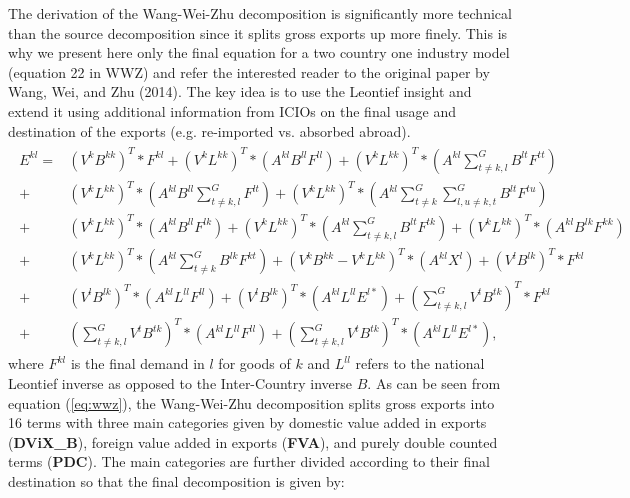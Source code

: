 \documentclass[a4paper]{article}\usepackage[]{graphicx}\usepackage[]{color}
\begin{document}
The derivation of the Wang-Wei-Zhu decomposition is significantly more technical than the source decomposition since it splits gross exports up more finely.
This is why we present here only the final equation for a two country one industry model (equation 22 in WWZ) and refer the interested reader to the original paper by Wang, Wei, and Zhu (2014).
The key idea is to use the Leontief insight and extend it using additional information from ICIOs on the final usage and destination of the exports (e.g. re-imported vs. absorbed abroad).
\begin{align}
\label{eq:wwz}
\begin{split}
E^{kl}
= &\left(V^k B^{kk} \right)^T * F^{kl} 
+ \left(V^k L^{kk} \right)^T * \left(A^{kl} B^{ll} F^{ll} \right)
+  \left(V^k L^{kk} \right)^T * (A^{kl} \sum_{t \neq k,l}^G  B^{lt} F^{tt} )\\
+& \left(V^k L^{kk} \right)^T *  (A^{kl} B^{ll} \sum_{t \neq k,l}^G  F^{lt} ) 
+  \left(V^k L^{kk} \right)^T * (A^{kl} \sum_{t \neq k}^G \sum_{l,u \neq k,t}^G B^{lt} F^{tu} ) \\
+& \left(V^k L^{kk} \right)^T * \left(A^{kl} B^{ll} F^{lk} \right)
+ \left(V^k L^{kk} \right)^T * (A^{kl} \sum_{t \neq k,l}^G  B^{lt} F^{tk} )
+ \left(V^k L^{kk} \right)^T * \left(A^{kl} B^{lk} F^{kk} \right) \\
+& \left(V^k L^{kk} \right)^T * (A^{kl} \sum_{t \neq k}^G  B^{lk} F^{kt} )
+ \left(V^k B^{kk} -  V^k L^{kk} \right)^T * \left(A^{kl} X^{l}  \right)
+ \left(V^l B^{lk} \right)^T * F^{kl} \\
+& \left(V^l B^{lk} \right)^T *  \left(A^{kl} L^{ll} F^{ll} \right)
+ \left(V^l B^{lk} \right)^T *  \left(A^{kl} L^{ll} E^{l*} \right)
+ (\sum_{t \neq k,l}^G  V^{t} B^{tk} )^{T} * F^{kl} \\
+& (\sum_{t \neq k,l}^G  V^{t} B^{tk} )^{T} *  \left(A^{kl} L^{ll} F^{ll} \right)
+ (\sum_{t \neq k,l}^G  V^{t} B^{tk} )^{T} *  \left(A^{kl} L^{ll} E^{l*} \right) ,
\end{split}
\end{align}
where $F^{kl}$ is the final demand in $l$ for goods of $k$ and $L^{ll}$ refers to the national Leontief inverse as opposed to the Inter-Country inverse $B$. As can be seen from equation (\ref{eq:wwz}), the Wang-Wei-Zhu decomposition splits gross exports into 16 terms with three main categories given by domestic value added in exports (\textbf{DViX\_B}), foreign value added in exports (\textbf{FVA}), and purely double counted terms (\textbf{PDC}). The main categories are further divided according to their final destination so that the final decomposition is given by:
\end{document}

